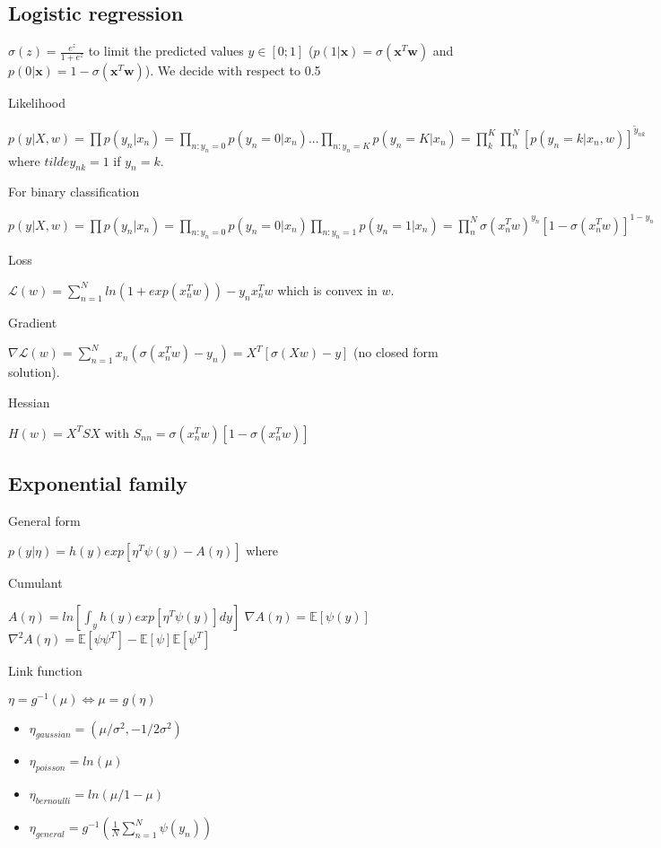 \subsection{Logistic regression}
$\sigma(z) = \frac{e^z}{1+e^z}$ to limit the predicted values $y\in [0;1]$ ($p(1|\mathbf{x}) = \sigma(\mathbf{x}^T\mathbf{w})$ and $p(0|\mathbf{x}) = 1-\sigma(\mathbf{x}^T\mathbf{w})$). We decide with respect to 0.5

Likelihood

$p(y | X,w) = \prod p(y_n|x_n) = \prod_{n:y_n=0} p(y_n=0|x_n) ... \prod_{n:y_n=K} p(y_n=K|x_n) = \prod^K_k \prod^N_n [p(y_n = k | x_n,w)]^{\tilde{y}_{nk}}$ where ${tilde{y}_{nk}} = 1$ if $y_n=k$.

For binary classification

$p(y | X, w) = \prod p(y_n|x_n) = \prod_{n:y_n=0} p(y_n=0|x_n) \prod_{n:y_n=1} p(y_n=1|x_n) = \prod^N_n \sigma({x_n^T w})^{y_n}[1-\sigma({x_n^T w})]^{1-y_n}$

Loss

$\mathcal{L}(w) = \sum_{n=1}^N ln(1 + exp(x_n^T w)) - y_n x_n^T w$ which is convex in $w$.

Gradient

$\nabla \mathcal{L}(w) = \sum_{n=1}^N x_n (\sigma(x_n^T w) - y_n) = X^T[\sigma(Xw) - y]$ (no closed form solution).

Hessian

$H(w) = X^T S X$ with $S_{nn} = \sigma(x_n^T w)[1-\sigma(x_n^T w)]$

\subsection{Exponential family}
General form

$p(y|\eta) = h(y) exp[\eta^T \psi(y) - A(\eta)]$ where

Cumulant
 
$A(\eta) = ln[\int_y h(y) exp[\eta^T \psi(y)] dy]$
\newline
$\nabla A(\eta) = \mathbb{E}[\psi(y)]$
\newline
$\nabla^2 A(\eta) = \mathbb{E}[\psi\psi^T] - \mathbb{E}[\psi]\mathbb{E}[\psi^T]$

Link function

$\eta = g^{-1}(\mu) \Leftrightarrow \mu = g(\eta)$

\begin{itemize}
\item $\eta_{gaussian} = (\mu / \sigma^2, - 1 / 2 \sigma^2)$
\item $\eta_{poisson} = ln(\mu)$	
\item $\eta_{bernoulli} = ln(\mu / 1 - \mu)$
\item $\eta_{general} = g^{-1}(\frac{1}{N} \sum_{n=1}^N \psi(y_n))$
\end{itemize}

